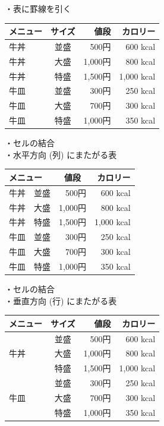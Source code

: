 \documentclass[a4paper,11pt]{jsarticle}
\begin{document}
    \begin{flushleft}
      ・表に罫線を引く
    \end{flushleft}
    \begin{table}[htb]
      \begin{tabular}{|l|c|r||r|} \hline
        メニュー & サイズ & 値段 & カロリー \\ \hline \hline
        牛丼 & 並盛 & 500円 & 600 kcal \\
        牛丼 & 大盛 & 1,000円 & 800 kcal \\
        牛丼 & 特盛 & 1,500円 & 1,000 kcal \\ \hline
        牛皿 & 並盛 & 300円 & 250 kcal \\
        牛皿 & 大盛 & 700円 & 300 kcal \\
        牛皿 & 特盛 & 1,000円 & 350 kcal \\ \hline
      \end{tabular}
    \end{table}
\newpage
    \begin{flushleft}
      ・セルの結合\\
      ・水平方向 (列) にまたがる表
    \end{flushleft}
    \begin{table}[htb]
      \begin{tabular}{|l|c|r||r|} \hline
        \multicolumn{2}{|l|}{メニュー}
          & \multicolumn{1}{c||}{値段} & \multicolumn{1}{r|}{カロリー}\\ \hline \hline
        牛丼 & 並盛 & 500円 & 600 kcal \\
        牛丼 & 大盛 & 1,000円 & 800 kcal \\
        牛丼 & 特盛 & 1,500円 & 1,000 kcal \\ \hline
        牛皿 & 並盛 & 300円 & 250 kcal \\
        牛皿 & 大盛 & 700円 & 300 kcal \\
        牛皿 & 特盛 & 1,000円 & 350 kcal \\ \hline
      \end{tabular}
    \end{table}

    \begin{flushleft}
      ・セルの結合\\
      ・垂直方向 (行) にまたがる表
    \end{flushleft}
    \begin{table}[htb]
      \begin{tabular}{|l|c|r||r|} \hline
        メニュー & サイズ & 値段 & カロリー \\ \hline \hline
          & 並盛 & 500円 & 600 kcal \\ \cline{2-4}
        牛丼 & 大盛 & 1,000円 & 800 kcal \\ \cline{2-4}
          & 特盛 & 1,500円 & 1,000 kcal \\ \hline
          & 並盛 & 300円 & 250 kcal \\ \cline{2-4}
        牛皿 & 大盛 & 700円 & 300 kcal \\ \cline{2-4}
          & 特盛 & 1,000円 & 350 kcal \\ \hline
      \end{tabular}
    \end{table}
\end{document}
